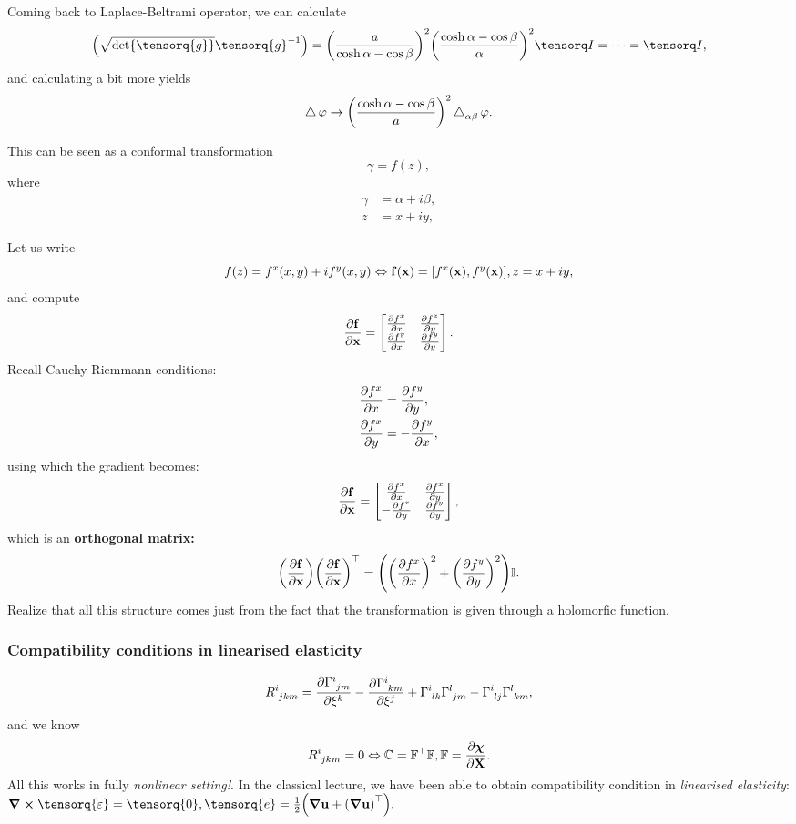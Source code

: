\documentclass[reqno, a4paper]{article}
\begin{document}
Coming back to Laplace-Beltrami operator, we can calculate
\[
	\qty(\sqrt{\det \tensorq{g}}\inverse{\tensorq{g}})=\qty(\frac{a}{\cosh \alpha-\cos \beta})^{2} \qty(\frac{\cosh \alpha-\cos \beta}{\alpha})^{2} \identity = \dots = \identity,
\]
and calculating a bit more yields
\[
	\operatorname{\bigtriangleup} \varphi \to \qty(\frac{\cosh \alpha-\cos \beta}{a})^{2} \operatorname{\bigtriangleup}_{\alpha \beta}\varphi.
\]
\begin{remark}
    This can be seen as a conformal transformation
    \[
	    \gamma = f(z),
    \]
    where
    \begin{align*}
	    \gamma &= \alpha + i \beta, \\
	    z &= x+iy,
    \end{align*}

Let us write
\[
	f(z) = f^x(x,y) +i f^y(x,y) \Leftrightarrow \vb{f}(\vb{x})=[f^x\qty(\vb{x}),f^y\qty(\vb{x})], z = x+iy,
\]
and compute
\[
	\pdv{\vb{f}}{\vb{x}} = \begin{bmatrix}
		\pdv{f^x}{x} & \pdv{f^x}{y}\\
		\pdv{f^y}{x} & \pdv{f^y}{y}
	\end{bmatrix}.
\]
Recall Cauchy-Riemmann conditions:
\begin{align*}
	\pdv{f^x}{x}&=\pdv{f^y}{y}, \\
	\pdv{f^x}{y}&=-\pdv{f^y}{x},
\end{align*}
using which the gradient becomes:
\[
	\pdv{\vb{f}}{\vb{x}} = \begin{bmatrix}
		\pdv{f^x}{x} & \pdv{f^x}{y}\\
		-\pdv{f^x}{y} & \pdv{f^y}{y}
	\end{bmatrix},
\]
which is an \textbf{orthogonal matrix:}
\[
	\qty(\pdv{\vb{f}}{\vb{x}}) \qty(\pdv{\vb{f}}{\vb{x}})^\top = \qty(\qty(\pdv{f^x}{x})^{2}+\qty(\pdv{f^y}{y})^{2})\mathbb{I}.
\]
Realize that all this structure comes just from the fact that the transformation is given through a holomorfic function.
\end{remark}

\subsubsection{Compatibility conditions in linearised elasticity}
\label{sec:compt_cond}

\[
	R \indices{^i_{jkm}}= \pdv{\Gamma \indices{^i_{jm}}}{\xi^k}-\pdv{\Gamma \indices{^i_{km}}}{\xi^j}+\Gamma \indices{^i_{lk}}\Gamma \indices{^l_{jm}}-\Gamma \indices{^i_{lj}}\Gamma \indices{^l_{km}},
\]
and we know
\[
	R \indices{^i_{jkm}} = 0 \Leftrightarrow \rcg = \transpose{\fgrad} \fgrad, \fgrad = \pdv{\vb*{\chi}}{\vb{X}}.
\]
All this works in fully \textit{nonlinear setting!}. In the classical lecture, we have been able to obtain compatibility condition in \textit{linearised elasticity}: $\curl{\tensorq{\varepsilon}} = \tensorq{0}, \tensorq{e}=\frac{1}{2}\qty(\grad \vb{u}+\transpose{\qty(\grad \vb{u})}).$
\end{document}
